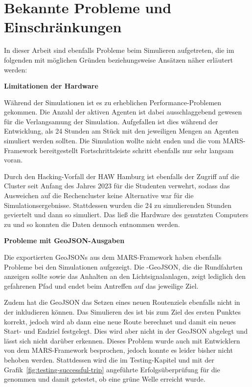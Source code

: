 %

\newpage


\section{Bekannte Probleme und Einschränkungen}\label{sec:limitations}

In dieser Arbeit sind ebenfalls Probleme beim Simulieren aufgetreten, die im folgenden mit möglichen Gründen beziehungsweise Ansätzen näher erläutert werden:

\textbf{Limitationen der Hardware}

Während der Simulationen ist es zu erheblichen Performance-Problemen gekommen.
Die Anzahl der aktiven Agenten ist dabei ausschlaggebend gewesen für die Verlangsamung der Simulation.
Aufgefallen ist dies während der Entwicklung, als 24 Stunden am Stück mit den jeweiligen Mengen an Agenten simuliert werden sollten.
Die Simulation wollte nicht enden und die vom MARS-Framework bereitgestellt Fortschrittsleiste schritt ebenfalls nur sehr langsam voran.

Durch den Hacking-Vorfall der HAW Hamburg ist ebenfalls der Zugriff auf die Cluster seit Anfang des Jahres 2023 für die Studenten verwehrt, sodass das Ausweichen auf die Rechencluster keine Alternative war für die Simulationsergebnisse.
Stattdessen wurden die 24 zu simulierenden Stunden geviertelt und dann so simuliert.
Das ließ die Hardware des genutzten Computers zu und so konnten die Daten dennoch entnommen werden.

\textbf{Probleme mit GeoJSON-Ausgaben}

Die exportierten GeoJSONs aus dem MARS-Framework haben ebenfalls Probleme bei den Simulationen aufgezeigt.
Die -GeoJSON, die die Rundfahrten anzeigen sollte sowie das Anhalten an den Lichtsignalanlagen, zeigt lediglich den gefahrenen Pfad und endet beim Antreffen auf das jeweilige Ziel.

Zudem hat die GeoJSON das Setzen eines neuen Routenziels ebenfalls nicht in der  inkludieren können.
Das Simulieren des  ist bis zum Ziel des ersten Punktes korrekt, jedoch wird ab dann eine neue Route berechnet und damit ein neues Start- und Endziel festgelegt.
Dies wird aber nicht in der GeoJSON abgelegt und lässt sich nicht darüber erkennen.
Dieses Problem wurde auch mit Entwicklern von dem MARS-Framework besprochen, jedoch konnte es leider bisher nicht behoben werden.
Stattdessen wird die im Testing-Kapitel und mit der Grafik~\ref{fig:testing-successful-trip} angeführte Erfolgsüberprüfung für die  genommen und damit getestet, ob eine grüne Welle erreicht wurde.

